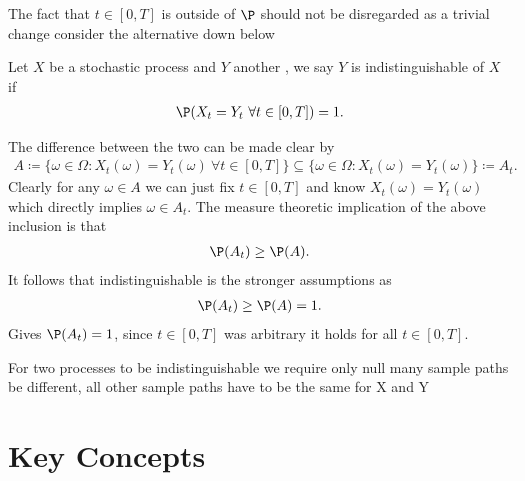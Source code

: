   \begin{remark}
    The fact that $t \in  [0,T]$  is outside of $\P$ should not be disregarded as a trivial change
    consider the alternative down below
  \end{remark}
  \begin{definition}[indistinguishable]
    Let $X$ be a stochastic process and $Y$ another , we say $Y$ is indistinguishable of $X$ if  
    \begin{align*}
      \P(X_t = Y_t \ \forall  t \in  [0,T]) = 1
    .\end{align*}
  \end{definition}
  The difference between the two can be made clear by
  \begin{align*}
    A \coloneqq  \{\omega  \in  \Omega  : X_t(\omega ) = Y_t(\omega ) \ \forall  t \in  [0,T] \} \subseteq  \{\omega  \in  \Omega  : X_t(\omega ) = Y_t(\omega )\} \coloneqq A_t    
  .\end{align*}
  Clearly for any $\omega  \in A $  we can just fix $t \in  [0,T]$ and know $X_t(\omega ) = Y_t(\omega )$ which directly implies $\omega  \in  A_t$.
  The measure theoretic implication of the above inclusion is that 
  \begin{align*}
    \P(A_t) \ge \P(A)
  .\end{align*}
  It follows that indistinguishable is the stronger assumptions as 
  \begin{align*}
    \P(A_t) \ge  \P(A) = 1
  .\end{align*}
  Gives $\P(A_t) = 1$, since $t \in  [0,T]$ was arbitrary it holds for all $t \in  [0,T]$.
  \begin{remark}
   For two processes to be indistinguishable we require only null many sample paths  be different, 
   all other sample paths have to be the same for X and Y
  \end{remark}
\section{Key Concepts}
